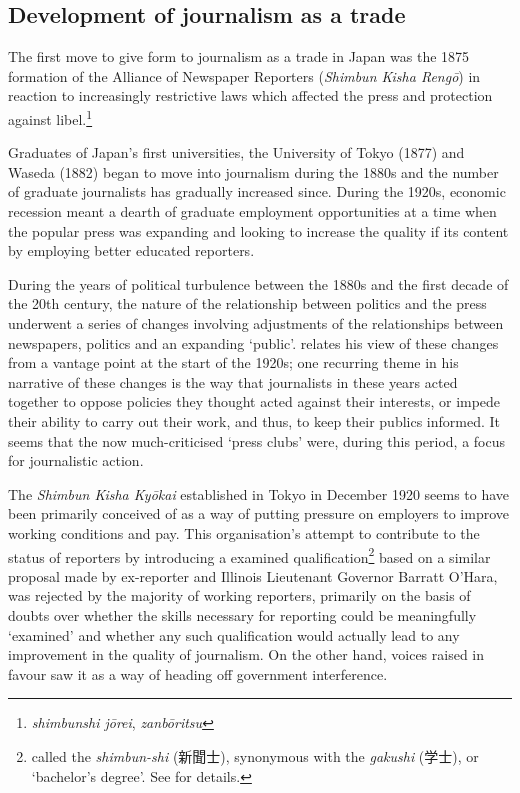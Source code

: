 \documentclass[11pt, headings=normal]{scrartcl}
\begin{document}
\hypertarget{development-of-journalism-as-a-trade}{%
\subsection{Development of journalism as a
trade}\label{development-of-journalism-as-a-trade}}

The first move to give form to journalism as a trade in Japan was the
\autocite[10]{Schafer:2012} 1875 formation of the Alliance of Newspaper
Reporters (\emph{Shimbun Kisha Rengō}) in reaction to increasingly
restrictive laws which affected the press and protection against
libel.\footnote{\emph{shimbunshi jōrei}, \emph{zanbōritsu}}

Graduates of Japan's first universities, the University of Tokyo (1877)
and Waseda (1882) began to move into journalism during the 1880s and the
number of graduate journalists has gradually increased since. During the
1920s, economic recession meant a dearth of graduate employment
opportunities at a time when the popular press was expanding and looking
to increase the quality if its content by employing better educated
reporters.\autocite[36]{Schafer:2012}

During the years of political turbulence between the 1880s and the first
decade of the 20th century, the nature of the relationship between
politics and the press underwent a series of changes involving
adjustments of the relationships between newspapers, politics and an
expanding `public'. \textcite{Kawabe:1921} relates his view of these
changes from a vantage point at the start of the 1920s; one recurring
theme in his narrative of these changes is the way that journalists in
these years acted together to oppose policies they thought acted against
their interests, or impede their ability to carry out their work, and
thus, to keep their publics informed. It seems that the now
much-criticised `press clubs' were, during this period, a focus for
journalistic action. \autocite[see especially][155--9]{Kawabe:1921}

The \emph{Shimbun Kisha Kyōkai} established in Tokyo in December 1920
seems to have been primarily conceived of as a way of putting pressure
on employers to improve working conditions and pay. This organisation's
attempt to contribute to the status of reporters by introducing a
examined qualification\footnote{called the \emph{shimbun-shi} (新聞士),
  synonymous with the \emph{gakushi} (学士), or `bachelor's degree'. See
  \textcite[122-133]{Kawasaki:2006} for details.} based on a similar
proposal made by ex-reporter and Illinois Lieutenant Governor Barratt
O'Hara, was rejected by the majority of working reporters, primarily on
the basis of doubts over whether the skills necessary for reporting
could be meaningfully `examined' and whether any such qualification
would actually lead to any improvement in the quality of journalism. On
the other hand, voices raised in favour saw it as a way of heading off
government interference.\autocite[124--5]{Kawasaki:2006}
\end{document}
